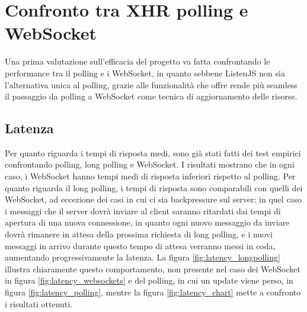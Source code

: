 \documentclass[12pt,a4paper,openright,twoside]{report}
\begin{document}
\section{Confronto tra XHR polling e WebSocket}\label{sec_confrontopollingwebsockets}

Una prima valutazione sull'efficacia del progetto va fatta confrontando le performance tra il polling e i WebSocket, in quanto sebbene ListenJS non sia l'alternativa unica al polling, grazie alle funzionalità che offre rende più seamless il passaggio da polling a WebSocket come tecnica di aggiornamento delle risorse.

\subsection{Latenza}
Per quanto riguarda i tempi di risposta medi, sono già stati fatti dei test empirici confrontando polling, long polling e WebSocket\cite{communicating_websocket}. I risultati mostrano che in ogni caso, i WebSocket hanno tempi medi di risposta inferiori rispetto al polling. Per quanto riguarda il long polling, i tempi di risposta sono comparabili con quelli dei WebSocket, ad eccezione dei casi in cui ci sia backpressure\cite{backpressure} sul server: in quel caso i messaggi che il server dovrà inviare al client saranno ritardati dai tempi di apertura di una nuova connessione, in quanto ogni nuovo messaggio da inviare dovrà rimanere in attesa della prossima richiesta di long polling, e i nuovi messaggi in arrivo durante questo tempo di attesa verranno messi in coda, aumentando progressivamente la latenza. La figura \ref{fig:latency_longpolling} illustra chiaramente questo comportamento, non presente nel caso dei WebSocket in figura \ref{fig:latency_websockets} e del polling, in cui un update viene perso, in figura \ref{fig:latency_polling}, mentre la figura \ref{fig:latency_chart} mette a confronto i risultati ottenuti.
\end{document}
